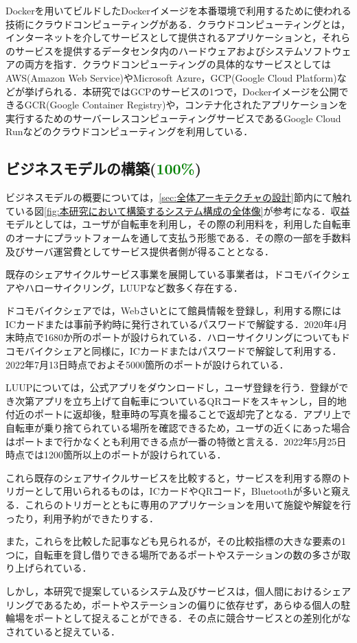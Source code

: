      \par Dockerを用いてビルドしたDockerイメージを本番環境で利用するために使われる技術にクラウドコンピューティングがある．クラウドコンピューティングとは，インターネットを介してサービスとして提供されるアプリケーションと，それらのサービスを提供するデータセンタ内のハードウェアおよびシステムソフトウェアの両方を指す．クラウドコンピューティングの具体的なサービスとしてはAWS(Amazon Web Service)やMicrosoft Azure，GCP(Google Cloud Platform)などが挙げられる．本研究ではGCPのサービスの1つで，Dockerイメージを公開できるGCR(Google Container Registry)や，コンテナ化されたアプリケーションを実行するためのサーバーレスコンピューティングサービスであるGoogle Cloud Runなどのクラウドコンピューティングを利用している．
      
  \subsection{ビジネスモデルの構築(\textcolor{green}{100\%})}
    \label{sec:ビジネスモデルの構築}
      \par ビジネスモデルの概要については，\ref{sec:全体アーキテクチャの設計}節内にて触れている図\ref{fig:本研究において構築するシステム構成の全体像}が参考になる．収益モデルとしては，ユーザが自転車を利用し，その際の利用料を，利用した自転車のオーナにプラットフォームを通して支払う形態である．その際の一部を手数料及びサーバ運営費としてサービス提供者側が得ることとなる．
      \par 既存のシェアサイクルサービス事業を展開している事業者は，ドコモバイクシェアやハローサイクリング，LUUPなど数多く存在する．
      \par ドコモバイクシェアでは，Webさいとにて館員情報を登録し，利用する際にはICカードまたは事前予約時に発行されているパスワードで解錠する．2020年4月末時点で1680か所のポートが設けられている．ハローサイクリングについてもドコモバイクシェアと同様に，ICカードまたはパスワードで解錠して利用する．2022年7月13日時点でおよそ5000箇所のポートが設けられている．
      \par LUUPについては，公式アプリをダウンロードし，ユーザ登録を行う．登録ができ次第アプリを立ち上げて自転車についているQRコードをスキャンし，目的地付近のポートに返却後，駐車時の写真を撮ることで返却完了となる．アプリ上で自転車が乗り捨てられている場所を確認できるため，ユーザの近くにあった場合はポートまで行かなくとも利用できる点が一番の特徴と言える．2022年5月25日時点では1200箇所以上のポートが設けられている．
      \par これら既存のシェアサイクルサービスを比較すると，サービスを利用する際のトリガーとして用いられるものは，ICカードやQRコード，Bluetoothが多いと窺える．これらのトリガーとともに専用のアプリケーションを用いて施錠や解錠を行ったり，利用予約ができたりする．
      \par また，これらを比較した記事なども見られるが，その比較指標の大きな要素の1つに，自転車を貸し借りできる場所であるポートやステーションの数の多さが取り上げられている．
      \par しかし，本研究で提案しているシステム及びサービスは，個人間におけるシェアリングであるため，ポートやステーションの偏りに依存せず，あらゆる個人の駐輪場をポートとして捉えることができる．その点に競合サービスとの差別化がなされていると捉えている．
